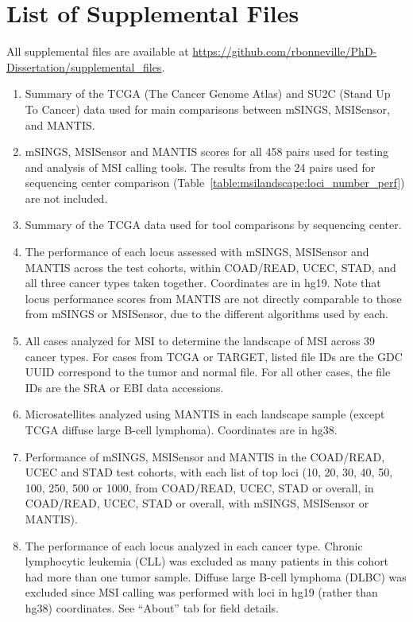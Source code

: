 \section{List of Supplemental Files}
All supplemental files are available at \url{https://github.com/rbonneville/PhD-Dissertation/supplemental_files}.
\begin{enumerate}
    \renewcommand*{\labelenumi}{S\thechapter{}.\arabic{enumi}. }
    \item Summary of the TCGA (The Cancer Genome Atlas) and SU2C (Stand Up To Cancer) data used for main comparisons between mSINGS, MSISensor, and MANTIS\@.
    \item mSINGS, MSISensor and MANTIS scores for all 458 pairs used for testing and analysis of MSI calling tools. The results from the 24 pairs used for sequencing center comparison (Table~\ref{table:msilandscape:loci_number_perf}) are not included.
    \item Summary of the TCGA data used for tool comparisons by sequencing center.
    \item The performance of each locus assessed with mSINGS, MSISensor and MANTIS across the test cohorts, within COAD/READ, UCEC, STAD, and all three cancer types taken together. Coordinates are in hg19. Note that locus performance scores from MANTIS are not directly comparable to those from mSINGS or MSISensor, due to the different algorithms used by each.
	\item All cases analyzed for MSI to determine the landscape of MSI across 39 cancer types. For cases from TCGA or TARGET, listed file IDs are the GDC UUID correspond to the tumor and normal file. For all other cases, the file IDs are the SRA or EBI data accessions.
	\item Microsatellites analyzed using MANTIS in each landscape sample (except TCGA diffuse large B-cell lymphoma). Coordinates are in hg38.
    \item Performance of mSINGS, MSISensor and MANTIS in the COAD/READ, UCEC and STAD test cohorts, with each list of top loci (10, 20, 30, 40, 50, 100, 250, 500 or 1000, from COAD/READ, UCEC, STAD or overall, in COAD/READ, UCEC, STAD or overall, with mSINGS, MSISensor or MANTIS).
	\item The performance of each locus analyzed in each cancer type. Chronic lymphocytic leukemia (CLL) was excluded as many patients in this cohort had more than one tumor sample. Diffuse large B-cell lymphoma (DLBC) was excluded since MSI calling was performed with loci in hg19 (rather than hg38) coordinates. See ``About'' tab for field details.

\end{enumerate}
